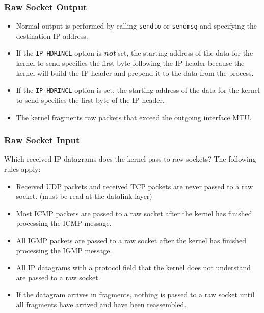 \documentclass[notes,serif]{beamer}
\begin{document}
\begin{frame}
\frametitle{Raw Socket Output}
\begin{itemize}
  \item Normal output is performed by calling \texttt{sendto} or \texttt{sendmsg} and specifying the destination IP address.
  \item If the \texttt{IP\_HDRINCL} option is \textbf{\emph{not}} set, the starting address of the data for the kernel to send specifies the first byte following the IP header because the kernel will build the IP header and prepend it to the data from the process.
  \item If the \texttt{IP\_HDRINCL} option is set, the starting address of the data for the kernel to send specifies the first byte of the IP header.
  \item The kernel fragments raw packets that exceed the outgoing interface MTU.
\end{itemize}
\end{frame}

\begin{frame}
\frametitle{Raw Socket Input}
Which received IP datagrams does the kernel pass to raw sockets? The following rules apply:
\begin{itemize}
  \item Received UDP packets and received TCP packets are never passed to a raw socket. (must be read at the datalink layer)
  \item Most ICMP packets are passed to a raw socket after the kernel has finished processing the ICMP message.
  \item All IGMP packets are passed to a raw socket after the kernel has finished processing the IGMP message.
  \item All IP datagrams with a protocol field that the kernel does not understand are passed to a raw socket.
  \item If the datagram arrives in fragments, nothing is passed to a raw socket until all fragments have arrived and have been reassembled.
\end{itemize}
\end{frame}
\end{document}
